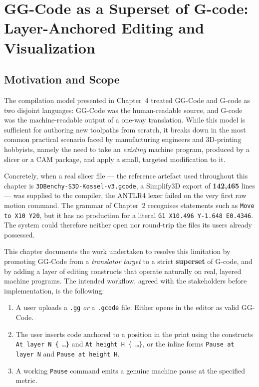 \chapter{GG-Code as a Superset of G-code: Layer-Anchored Editing and Visualization}

\section{Motivation and Scope}

The compilation model presented in Chapter~4 treated GG-Code and G-code as two disjoint languages: GG-Code was the human-readable source, and G-code was the machine-readable output of a one-way translation. While this model is sufficient for authoring new toolpaths from scratch, it breaks down in the most common practical scenario faced by manufacturing engineers and 3D-printing hobbyists, namely the need to take an \emph{existing} machine program, produced by a slicer or a CAM package, and apply a small, targeted modification to it.

Concretely, when a real slicer file --- the reference artefact used throughout this chapter is \texttt{3DBenchy-S3D-Kossel-v3.gcode}, a Simplify3D export of \textbf{142{,}465} lines --- was supplied to the compiler, the ANTLR4 lexer failed on the very first raw motion command. The grammar of Chapter~2 recognises statements such as \texttt{Move to X10 Y20}, but it has no production for a literal \texttt{G1 X10.496 Y-1.648 E0.4346}. The system could therefore neither open nor round-trip the files its users already possessed.

This chapter documents the work undertaken to resolve this limitation by promoting GG-Code from a \emph{translator target} to a strict \textbf{superset} of G-code, and by adding a layer of editing constructs that operate naturally on real, layered machine programs. The intended workflow, agreed with the stakeholders before implementation, is the following:

\begin{enumerate}
    \item A user uploads a \texttt{.gg} \emph{or} a \texttt{.gcode} file. Either opens in the editor as valid GG-Code.
    \item The user inserts code anchored to a position in the print using the constructs \texttt{At layer N \{ \ldots \}} and \texttt{At height H \{ \ldots \}}, or the inline forms \texttt{Pause at layer N} and \texttt{Pause at height H}.
    \item A working \texttt{Pause} command emits a genuine machine pause at the specified metric.
\end{enumerate}

